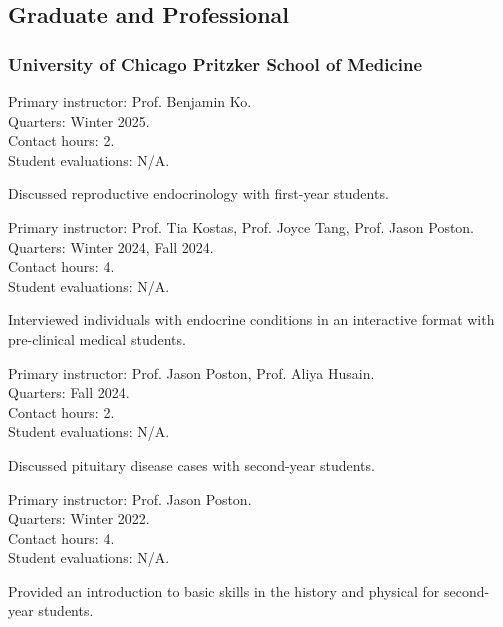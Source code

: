 \documentclass[%
DIV=19,
]{komacv}
\begin{document}

\begin{longcv}

\subsection{Graduate and Professional}

\subsubsection{University of Chicago Pritzker School of Medicine}

{Primary instructor: Prof. Benjamin Ko.\\
Quarters: Winter 2025.\\
Contact hours: 2.\\
Student evaluations: N/A.
\begin{compactitem}
\item Discussed reproductive endocrinology with first-year students.
\end{compactitem}}

{Primary instructor: Prof. Tia Kostas, Prof. Joyce Tang, Prof. Jason Poston.\\
Quarters: Winter 2024, Fall 2024.\\
Contact hours: 4.\\
Student evaluations: N/A.
\begin{compactitem}
\item Interviewed individuals with endocrine conditions in an interactive format with pre-clinical medical students.
\end{compactitem}}

{Primary instructor: Prof. Jason Poston, Prof. Aliya Husain.\\
Quarters: Fall 2024.\\
Contact hours: 2.\\
Student evaluations: N/A.
\begin{compactitem}
\item Discussed pituitary disease cases with second-year students.
\end{compactitem}}

{Primary instructor: Prof. Jason Poston.\\
Quarters: Winter 2022.\\
Contact hours: 4.\\
Student evaluations: N/A.
\begin{compactitem}
\item Provided an introduction to basic skills in the history and physical for second-year students.
\end{compactitem}}


\end{longcv}
\end{document}
